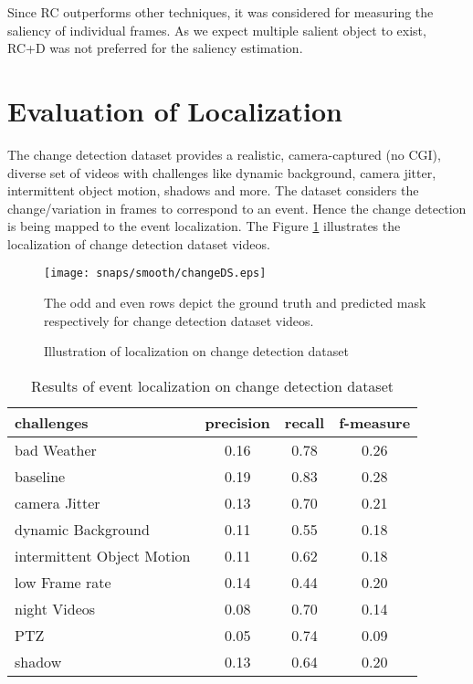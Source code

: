 \par Since RC outperforms other techniques, it was considered for measuring the saliency of individual frames.  As we expect multiple salient object to exist, RC+D was not preferred for the saliency estimation.
 
\section{Evaluation of Localization}
\label{sec:EvLoc}
The change detection dataset \citep{cdnet} provides  a realistic, camera-captured (no CGI), diverse set of videos with challenges like dynamic background, camera jitter, intermittent object motion, shadows and more.  The dataset considers the change/variation in frames to correspond to an event. Hence the change detection is being mapped to the event localization.  The Figure \ref{fig:changeDb} illustrates the localization of change detection dataset videos.
\begin{figure}[htpb]
   \begin{center}
	    \texttt{[image: snaps/smooth/changeDS.eps]}     
     \caption {Illustration of localization on change detection dataset}
   \label{fig:changeDb}
    \medskip \small The odd and even rows depict the ground truth and predicted mask respectively for change detection dataset videos. 
   \end{center}
 \end{figure}
\begin{table}[htbp]
   \caption{Results of event localization on change detection dataset}
   \begin{center}
   \begin{tabular}{|l|c|c|c|} \hline
        \textbf{challenges} & \textbf{precision} & \textbf{recall} & \textbf{f-measure} \\ \hline
		bad Weather & 0.16 & 0.78 & 0.26\\
		baseline & 0.19 & 0.83 & 0.28\\
		camera Jitter & 0.13 & 0.70 & 0.21 \\
		dynamic Background & 0.11 & 0.55 &  0.18\\
		intermittent Object Motion & 0.11 & 0.62 & 0.18 \\
		low Frame rate & 0.14 & 0.44 & 0.20 \\
		night Videos & 0.08 & 0.70 & 0.14 \\
		PTZ & 0.05 & 0.74 & 0.09\\
		shadow & 0.13 & 0.64 & 0.20\\ \hline
   \end{tabular}
   \label{tab:evalLoc}
   \end{center}
 \end{table} 
